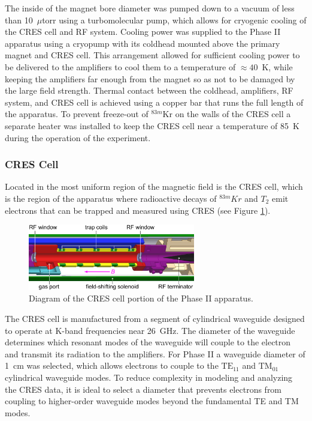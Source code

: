The inside of the magnet bore diameter was pumped down to a vacuum of less than 10~$\mu$torr using a turbomolecular pump, which allows for cryogenic cooling of the CRES cell and RF system. Cooling power was supplied to the Phase II apparatus using a cryopump with its coldhead mounted above the primary magnet and CRES cell. This arrangement allowed for sufficient cooling power to be delivered to the amplifiers to cool them to a temperature of $\approx 40$~K, while keeping the amplifiers far enough from the magnet so as not to be damaged by the large field strength. Thermal contact between the coldhead, amplifiers, RF system, and CRES cell is achieved using a copper bar that runs the full length of the apparatus. To prevent freeze-out of $^{83m}$Kr on the walls of the CRES cell a separate heater was installed to keep the CRES cell near a temperature of 85~K during the operation of the experiment.

\subsubsection*{CRES Cell}

Located in the most uniform region of the magnetic field is the CRES cell, which is the region of the apparatus where radioactive decays of $^{83m}Kr$ and $T_2$ emit electrons that can be trapped and measured using CRES (see Figure \ref{fig:chap3-cres-cell}).
\begin{figure}[htbp]
    \centering
    \includegraphics*[width=0.65\textwidth]{figs/Chapter-3/apparatus.pdf}
    \caption{\label{fig:chap3-cres-cell} Diagram of the CRES cell portion of the Phase II apparatus.}
\end{figure}
The CRES cell is manufactured from a segment of cylindrical waveguide designed to operate at K-band frequencies near 26~GHz. The diameter of the waveguide determines which resonant modes of the waveguide will couple to the electron and transmit its radiation to the amplifiers. For Phase II a waveguide diameter of 1~cm was selected, which allows electrons to couple to the $\mathrm{TE}_{11}$ and $\mathrm{TM}_{01}$ cylindrical waveguide modes. To reduce complexity in modeling and analyzing the CRES data, it is ideal to select a diameter that prevents electrons from coupling to higher-order waveguide modes beyond the fundamental TE and TM modes. 

